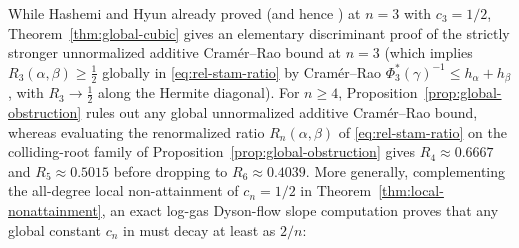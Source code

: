 \documentclass[11pt,a4paper]{article}
\theoremstyle{definition}
\begin{document}
While Hashemi and Hyun \cite[\S 8]{HH2026} already proved \cite[Conjecture~8.1]{HH2026} (and hence \cite[eq.~(101)]{HH2026}) at $n=3$ with $c_3 = 1/2$, Theorem~\ref{thm:global-cubic} gives an elementary discriminant proof of the strictly stronger unnormalized additive Cram\'er--Rao bound at $n=3$ (which implies $R_3(\alpha,\beta) \ge \frac{1}{2}$ globally in \eqref{eq:rel-stam-ratio} by Cram\'er--Rao $\Phi_3^*(\gamma)^{-1} \le h_\alpha + h_\beta$, with $R_3 \to \frac{1}{2}$ along the Hermite diagonal). For $n \ge 4$, Proposition~\ref{prop:global-obstruction} rules out any global unnormalized additive Cram\'er--Rao bound, whereas evaluating the renormalized ratio $R_n(\alpha,\beta)$ of \eqref{eq:rel-stam-ratio} on the colliding-root family of Proposition~\ref{prop:global-obstruction} gives $R_4 \approx 0.6667$ and $R_5 \approx 0.5015$ before dropping to $R_6 \approx 0.4039$. More generally, complementing the all-degree local non-attainment of $c_n = 1/2$ in Theorem~\ref{thm:local-nonattainment}, an exact log-gas Dyson-flow slope computation proves that any global constant $c_n$ in \cite[Conjecture~8.1 / eqs.~(100)--(101)]{HH2026} must decay at least as $2/n$:
\end{document}
